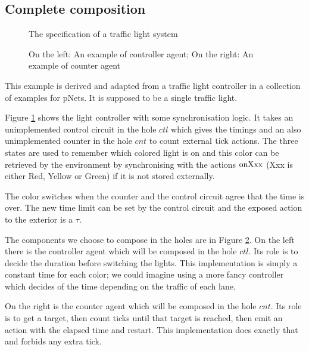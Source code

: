 \documentclass{article}
\begin{document}
\subsection{Complete composition}\label{apx:composition}
\begin{figure}[h]
\centering

\caption{The specification of a traffic light system}
\label{fig:tls}
\end{figure}
\begin{figure}
\centering

\vrule

\caption{On the left: An example of controller agent; On the right: An example of counter agent}
\label{fig:tlh}
\end{figure}
This example is derived and adapted from a traffic light controller in a collection of examples for pNets.
It is supposed to be a single traffic light.

Figure \ref{fig:tls} shows the light controller with some synchronisation logic.
It takes an unimplemented control circuit in the hole \(ctl\) which gives the timings and an also unimplemented counter in the hole \(cnt\) to count external \(\mathrm{tick}\) actions.
The three states are used to remember which colored light is on and this color can be retrieved by the environment by synchronising with the actions \(\mathrm{onXxx}\) (Xxx is either Red, Yellow or Green) if it is not stored externally.

The color switches when the counter and the control circuit agree that the time is over.
The new time limit can be set by the control circuit and the exposed action to the exterior is a \(\tau\).

The components we choose to compose in the holes are in Figure \ref{fig:tlh}.
On the left there is the controller agent which will be composed in the hole \(ctl\).
Its role is to decide the duration before switching the lights.
This implementation is simply a constant time for each color; we could imagine using a more fancy controller which decides of the time depending on the traffic of each lane.

On the right is the counter agent which will be composed in the hole \(cnt\).
Its role is to get a target, then count ticks until that target is reached, then emit an action with the elapsed time and restart.
This implementation does exactly that and forbids any extra tick.
\end{document}

